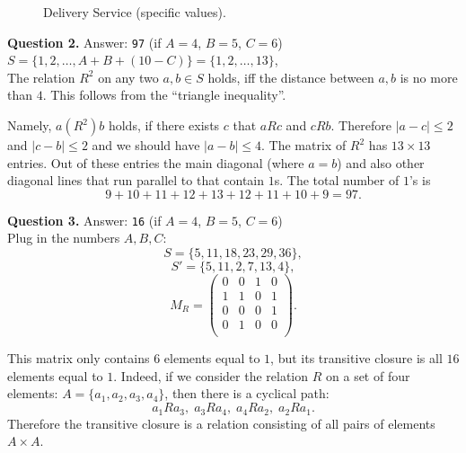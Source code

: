 \documentclass[jou]{apa6}
\begin{document}
\begin{figure}[!htb]
\caption{\label{fig:k33-weights-456} Delivery Service (specific values).}
\end{figure}


\vspace{6pt}
{\bf Question 2.} Answer: {\tt 97} (if $A = 4$, $B = 5$, $C = 6$)\\ 
$S = \{ 1,2,\ldots,A + B + (10-C) \} = \{ 1,2,\ldots,13 \}$,\\
The relation $R^2$ on any two $a,b \in S$ holds, iff 
the distance between $a,b$ is no more than $4$.
This follows from the ``triangle inequality''. 

Namely, $a(R^2)b$ holds, if there exists $c$ that $aRc$ and $cRb$. 
Therefore $|a-c| \leq 2$ and $|c-b| \leq 2$ and we should have 
$|a - b| \leq 4$. The matrix of $R^2$ has $13 \times 13$ entries. 
Out of these entries the main diagonal (where $a=b$) and also 
other diagonal lines that run parallel to that contain $1$s.
The total number of $1$'s is 
$$9 + 10 + 11 + 12 + 13 + 12 + 11 + 10 + 9 = 97.$$







\vspace{6pt}
{\bf Question 3.} Answer: {\tt 16} (if $A = 4$, $B = 5$, $C = 6$)\\ 
Plug in the numbers $A,B,C$: 
$$S = \{ 5, 11, 18, 23, 29, 36 \},$$
$$S' = \{ 5, 11, 2, 7, 13, 4 \},$$
$$M_R = \left( \begin{array}{cccc}
0 & 0 & 1 & 0 \\
1 & 1 & 0 & 1 \\
0 & 0 & 0 & 1 \\
0 & 1 & 0 & 0 \\
\end{array} \right).$$

This matrix only contains $6$ elements equal to $1$, but its transitive
closure is all $16$ elements equal to $1$. Indeed, if we consider the relation $R$ 
on a set of four elements: $A = \{ a_1, a_2, a_3, a_4 \}$, then there is a cyclical path: 
$$a_1Ra_3,\;a_3Ra_4,\;a_4Ra_2,\;a_2Ra_1.$$
Therefore the transitive closure is a relation consisting of all pairs of elements $A \times A$. 
\end{document}
